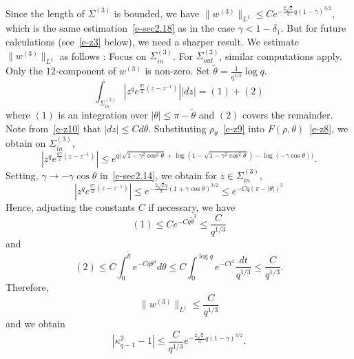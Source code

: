 \documentclass{amsart}
\theoremstyle{definition}
\theoremstyle{remark}
\numberwithin{equation}{section}
\newcommand{\wt}{\widetilde}
\begin{document}
Since the length of $\Sigma^{(3)}$ is bounded, we have $\|w^{(3)}\|_{L^1} 
\le Ce^{-\frac{2\sqrt{2}}3q(1-\gamma)^{3/2}}$, which is 
the same estimation~\eqref{e-sec2.18} as in the case $\gamma<1-\delta_1$. 
But for future calculations (see~\eqref{e-z3} below), we need a sharper result.
We estimate $\|w^{(3)}\|_{L^1}$ as follows :
  Focus on $\Sigma^{(3)}_{in}$.
For $\Sigma^{(3)}_{out}$, similar computations apply.
Only the $12$-component of $w^{(3)}$ is non-zero.
  Set $\wt{\theta}=\frac1{q^{1/3}}\log{q}$.
  $$\int_{\Sigma^{(3)}_{in}}|z^qe^{\frac{q\gamma}{2}(z-z^{-1})}||dz|= (1)+(2
)$$
  where $(1)$ is an integration over $|\theta|\le \pi-\wt{\theta}$
and $(2)$ covers the remainder.
  Note from~\eqref{e-z10} that $|dz|\le Cd\theta$. 
Substituting $\rho_\theta$~\eqref{e-z9} into $F(\rho,\theta)$~\eqref{e-z8}, 
we obtain on $\Sigma^{(3)}_{in}$, 
\begin{equation}\label{e-z11}
    |z^qe^{\frac{q\gamma}2(z-z^{-1})}|\le e^{
q\bigl(\sqrt{1-\gamma^2\cos^2\theta}+\log(1-\sqrt{1-\gamma^2\cos^2\theta})
-\log(-\gamma\cos\theta)\bigr)}.
\end{equation}
Setting, $\gamma\to -\gamma\cos\theta$ in~\eqref{e-sec2.14}, 
we obtain for $z\in\Sigma^{(3)}_{in}$, 
\begin{equation}\label{e-z12}
    |z^qe^{\frac{q\gamma}2(z-z^{-1})}|\le
e^{-\frac{2\sqrt{2}q}{3}(1+\gamma\cos\theta)^{3/2}}
\le e^{-Cq(\pi-|\theta|)^3}
\end{equation}
Hence, adjusting the constants $C$ if necessary, 
we have 
  $$(1)\le Ce^{-Cq\wt{\theta}^3} \le \frac{C}{q^{1/3}}$$
and $$(2)\le C\int_0^{\wt{\theta}} e^{-Cq\theta^3} d\theta
\le C\int_0^{\log{q}} e^{-Ct^3} \frac{dt}{q^{1/3}} \le \frac{C}{q^{1/3}}.$$
Therefore, 
\begin{equation}\label{6.9}
   \|w^{(3)}\|_{L^1}\le \frac{C}{q^{1/3}}
\end{equation}
and we obtain
\begin{equation}\label{e-sec3f}
   |\kappa^2_{q-1}-1|\le
\frac{C}{q^{1/3}}e^{-\frac{2\sqrt{2}}3q(1-\gamma)^{3/2}}.
\end{equation}
\end{document}
